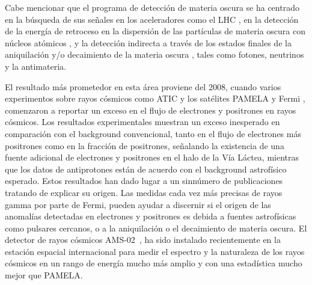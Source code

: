 Cabe mencionar que el programa de detección de materia oscura se ha
centrado en la búsqueda de sus señales en los aceleradores como el LHC
\cite{Baltz:2006fm,Cho:2008tj,Nath:2010zj}, en la detección de la
energía de retroceso en la dispersión de las partículas de materia
oscura con núcleos atómicos
\cite{Green:2007rb,Bertone:2007xj,Drees:2008bv,Green:2008rd}, y la
detección indirecta a través de los estados finales de la aniquilación
y/o decaimiento de la materia oscura
\cite{Bertone:2007aw,Eichler:1989br,Arvanitaki:2008hq,Ibarra:2008jk,Ibarra:2008qg,Buckley:2009kw,Ibarra:2009tn,Ruderman:2009ta},
tales como fotones, neutrinos y la antimateria.


El resultado más prometedor en esta área proviene del 2008, cuando
varios experimentos sobre rayos cósmicos como ATIC \cite{:2008zzr} y
los satélites PAMELA \cite{Adriani:2008zr} y Fermi
\cite{Abdo:2009zk}, comenzaron a reportar un exceso en el flujo de
electrones y positrones en rayos cósmicos.
%
Los resultados experimentales muestran un exceso
inesperado en comparación con el background convencional, tanto en el
flujo de electrones más positrones como en la fracción de positrones,
señalando la existencia de una fuente adicional de electrones y
positrones en el halo de la Vía Láctea, mientras que los datos de
antiprotones están de acuerdo con el background astrofísico esperado. 
%
Estos resultados han dado lugar a un sinnúmero de publicaciones
tratando de explicar su origen. Las medidas cada vez más precisas de
rayos gamma por parte de Fermi, pueden ayudar a discernir si el
origen de las anomalías detectadas en electrones y positrones es
debida a fuentes astrofísicas como pulsares cercanos, o a la
aniquilación o el decaimiento de materia oscura.
%
El detector de rayos cósmicos AMS-02~\cite{ams:2009}, ha sido
instalado recientemente en la estación espacial internacional para
medir el espectro y la naturaleza de los rayos cósmicos en un rango de energía
mucho más amplio y con una estadística mucho mejor que PAMELA.

